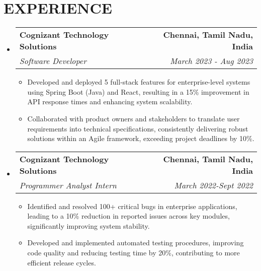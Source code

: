 \documentclass[letterpaper,11pt]{article}
\makeatletter
\newcommand{\resumeItem}[1]{\item\small{{#1 \vspace{-2pt}}}}
\newcommand{\resumeSubheading}[4]{\vspace{-2pt}\item\begin{tabular*}{0.97\textwidth}[t]{l@{\extracolsep{\fill}}r}\textbf{#1} & #2 \\\textit{\small#3} & \textit{\small #4} \\\end{tabular*}\vspace{-7pt}}
\newcommand{\resumeSubHeadingListStart}{\begin{itemize}[leftmargin=0.15in, label={}]}
\newcommand{\resumeSubHeadingListEnd}{\end{itemize}}
\newcommand{\resumeItemListStart}{\begin{itemize}}
\newcommand{\resumeItemListEnd}{\end{itemize}\vspace{-5pt}}
\makeatother
\begin{document}
\section{{\fontsize{9pt}{20pt}\selectfont \textbf{EXPERIENCE}}}
\resumeSubHeadingListStart
\resumeSubheading{Cognizant Technology Solutions}{\textbf{Chennai, Tamil Nadu, India}}{Software Developer}{March 2023 - Aug 2023}
\resumeItemListStart
\resumeItem{Developed and deployed 5 full-stack features for enterprise-level systems using Spring Boot (Java) and React, resulting in a 15\% improvement in API response times and enhancing system scalability.}
\resumeItem{Collaborated with product owners and stakeholders to translate user requirements into technical specifications, consistently delivering robust solutions within an Agile framework, exceeding project deadlines by 10\%.}
\resumeItemListEnd
\resumeSubheading{Cognizant Technology Solutions}{\textbf{Chennai, Tamil Nadu, India}}{Programmer Analyst Intern}{March 2022-Sept 2022}
\resumeItemListStart
\resumeItem{Identified and resolved 100+ critical bugs in enterprise applications, leading to a 10\% reduction in reported issues across key modules, significantly improving system stability.}
\resumeItem{Developed and implemented automated testing procedures, improving code quality and reducing testing time by 20\%, contributing to more efficient release cycles.}
\resumeItemListEnd
\resumeSubHeadingListEnd
\vspace{-17pt}
\end{document}
